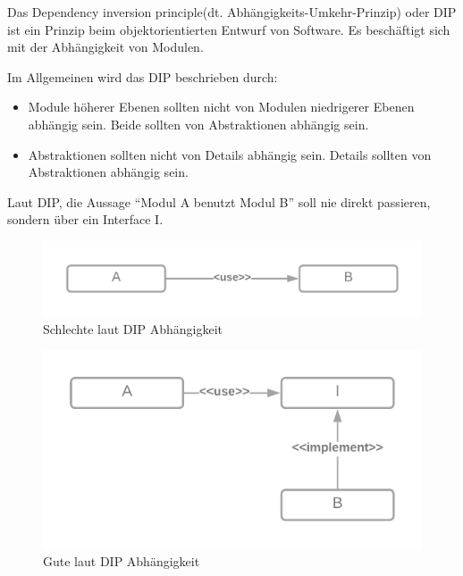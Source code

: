 Das Dependency inversion principle(dt. Abhängigkeits-Umkehr-Prinzip) oder DIP ist ein Prinzip 
beim objektorientierten Entwurf von Software. Es beschäftigt sich mit der Abhängigkeit von Modulen.

Im Allgemeinen wird das DIP beschrieben durch:

\begin{itemize}
    \item Module höherer Ebenen sollten nicht von Modulen niedrigerer Ebenen abhängig sein.
    Beide sollten von Abstraktionen abhängig sein.
    \item Abstraktionen sollten nicht von Details abhängig sein.
    Details sollten von Abstraktionen abhängig sein.
\end{itemize}

Laut DIP, die Aussage ``Modul A benutzt Modul B'' soll nie direkt passieren, sondern über ein Interface I.

\begin{figure}[H]
    \centering
    \includegraphics[width=1\textwidth]{./images/DIP - bad.png}
    \caption[Schlechte laut DIP Abhängigkeit]{Schlechte laut DIP Abhängigkeit}
    \label{fig:MVP}
\end{figure}


\begin{figure}[H]
    \centering
    \includegraphics[width=1\textwidth]{./images/DIP - good.png}
    \caption[Gute laut DIP Abhängigkeit]{Gute laut DIP Abhängigkeit}
    \label{fig:MVP}
\end{figure}

